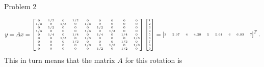 \begin{problem}{Problem 2}
\begin{highlight}
        \begin{equation}
            \tiny{
                y = Ax =
                \begin{bmatrix}
                    0 & 1/2 & 0 & 1/2 & 0 & 0 & 0 & 0 & 0 \\
                    1/3 & 0 & 1/3 & 0 & 1/3 & 0 & 0 & 0 & 0 \\
                    0 & 1/2 & 0 & 0 & 0 & 1/2 & 0 & 0 & 0 \\
                    1/3 & 0 & 0 & 0 & 1/3 & 0 & 1/3 & 0 & 0 \\
                    0 & 1/4 & 0 & 1/4 & 0 & 1/4 & 0 & 1/4 & 0 \\
                    0 & 0 & 1/3 & 0 & 1/3 & 0 & 0 & 0 & 1/3 \\
                    0 & 0 & 0 & 1/2 & 0 & 0 & 0 & 1/2 & 0 \\
                    0 & 0 & 0 & 0 & 1/3 & 0 & 1/3 & 0 & 1/3 \\
                    0 & 0 & 0 & 0 & 0 & 1/2 & 0 & 1/2 & 0 \\
                \end{bmatrix}
                \begin{bmatrix}
                    1 \\
                    2 \\
                    3 \\
                    4 \\
                    5 \\
                    6 \\
                    7 \\
                    8 \\
                    9 \\
                \end{bmatrix}
                = 
                \begin{bmatrix}
                    3 & 2.97 & 4 & 4.29 & 5 & 5.61 & 6 & 6.93 & 7 \\
                \end{bmatrix}^{T}.
            }
            \normalsize
        \end{equation}
        This in turn means that the matrix $A$ for this rotation is


\end{highlight}
\end{problem}

